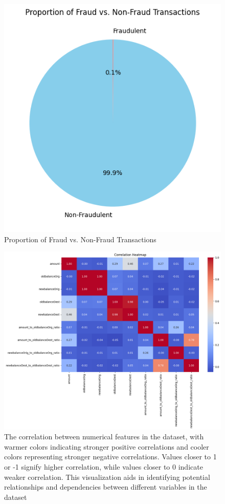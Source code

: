 \begin{figure}[H]
	\centering
	\includegraphics[width=0.7\linewidth]{chap4/3}
	\caption{Proportion of Fraud vs. Non-Fraud Transactions}
	\label{fig:3}
\end{figure}

\begin{figure}[H]
	\centering
	\includegraphics[width=0.7\linewidth]{chap4/4}
	\caption{The correlation between numerical features in the dataset, with warmer colors indicating stronger positive correlations and cooler colors representing stronger negative correlations. Values closer to 1 or -1 signify higher correlation, while values closer to 0 indicate weaker correlation. This visualization aids in identifying potential relationships and dependencies between different variables in the dataset}
	\label{fig:4}
\end{figure}



